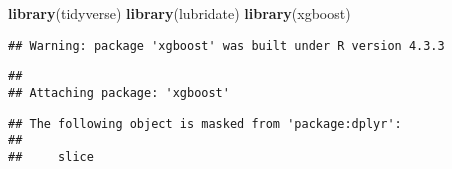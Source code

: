 \documentclass[
]{article}
\newenvironment{Shaded}{\begin{snugshade}}{\end{snugshade}}
\newcommand{\FunctionTok}[1]{\textcolor[rgb]{0.13,0.29,0.53}{\textbf{#1}}}
\newcommand{\NormalTok}[1]{#1}
\begin{document}
\begin{Shaded}
\begin{Highlighting}[]
\FunctionTok{library}\NormalTok{(tidyverse)}
\FunctionTok{library}\NormalTok{(lubridate)}
\FunctionTok{library}\NormalTok{(xgboost)}
\end{Highlighting}
\end{Shaded}

\begin{verbatim}
## Warning: package 'xgboost' was built under R version 4.3.3
\end{verbatim}

\begin{verbatim}
## 
## Attaching package: 'xgboost'
\end{verbatim}

\begin{verbatim}
## The following object is masked from 'package:dplyr':
## 
##     slice
\end{verbatim}
\end{document}

